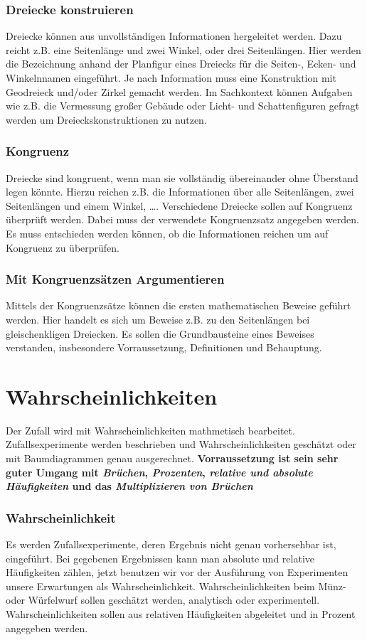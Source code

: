 \documentclass{article}
\begin{document}
\subsubsection*{Dreiecke konstruieren}
Dreiecke können aus unvollständigen Informationen hergeleitet werden.
Dazu reicht z.B. eine Seitenlänge und zwei Winkel, oder drei Seitenlängen.
Hier werden die Bezeichnung anhand der Planfigur eines Dreiecks für die Seiten-, Ecken- und Winkelnnamen eingeführt.
Je nach Information muss eine Konstruktion mit Geodreieck und/oder Zirkel gemacht werden.
Im Sachkontext können Aufgaben wie z.B. die Vermessung großer Gebäude oder Licht- und Schattenfiguren gefragt werden um Dreieckskonstruktionen zu nutzen.
\subsubsection*{Kongruenz}
Dreiecke sind kongruent, wenn man sie vollständig übereinander ohne Überstand legen könnte. Hierzu reichen z.B. die Informationen über alle Seitenlängen, zwei Seitenlängen und einem Winkel, \ldots.
Verschiedene Dreiecke sollen auf Kongruenz überprüft werden. Dabei muss der verwendete Kongruenzsatz angegeben werden.
Es muss entschieden werden können, ob die Informationen reichen um auf Kongruenz zu überprüfen.
\subsubsection*{Mit Kongruenzsätzen Argumentieren}
Mittels der Kongruenzsätze können die ersten mathematischen Beweise geführt werden. Hier handelt es sich um Beweise z.B.  zu den Seitenlängen bei gleischenkligen Dreiecken. Es sollen die Grundbausteine eines Beweises verstanden, insbesondere Vorraussetzung, Definitionen und Behauptung.
\newpage
\section{Wahrscheinlichkeiten}
Der Zufall wird mit Wahrscheinlichkeiten mathmetisch bearbeitet. Zufallsexperimente werden beschrieben und Wahrscheinlichkeiten geschätzt oder mit Baumdiagrammen genau ausgerechnet.
\textbf{Vorraussetzung ist sein sehr guter Umgang mit \textit{Brüchen}, \textit{Prozenten}, \textit{relative und absolute Häufigkeiten} und das \textit{Multiplizieren von Brüchen}}
\subsubsection*{Wahrscheinlichkeit}
Es werden Zufallsexperimente, deren Ergebnis nicht genau vorhersehbar ist, eingeführt. Bei gegebenen Ergebnissen kann man absolute und relative Häufigkeiten zählen, jetzt benutzen wir vor der Ausführung von Experimenten unsere Erwartungen als  Wahrscheinlichkeit.
Wahrscheinlichkeiten beim Münz- oder Würfelwurf sollen geschätzt werden, analytisch oder experimentell.
Wahrscheinlichkeiten sollen aus relativen Häufigkeiten abgeleitet und in Prozent angegeben werden.
\end{document}
